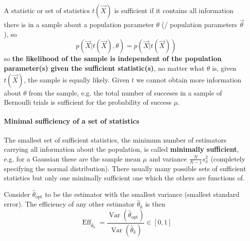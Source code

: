 A statistic or set of statistics $t(\vec{X})$ is sufficient if it contains all information there is in a sample
about a population parameter $\theta$ (/ population parameters $\vec{\theta}$), so
\begin{equation}
   p(\vec{X} | t(\vec{X}), \theta) = p(\vec{X} | t(\vec{X}))
\end{equation}
so \textbf{the likelihood of the sample is independent of the population parameter(s) given the sufficient statistic(s)},
no matter what $\theta$ is, given $t(\vec{X})$, the sample is equally likely. Given $t$ we cannot obtain more
information about $\theta$ from the sample, e.g. the total number of succeses in a sample of Bernoulli trials is sufficient
for the probability of success $\mu$.

\paragraph*{Minimal sufficiency of a set of statistics} The smallest set of sufficient statistics, the minimum number of estimators
carrying all information about the population, is called \textbf{minimally sufficient}, e.g. for a Gaussian these
are the sample mean $\mu$ and variance $\frac{N}{N-1} s_x^2$ (completely specifying the normal distribution). There
usually many possible sets of sufficient statistics but only one minimally sufficient one which the others
are functions of.

Consider $\hat{\theta}_\text{opt}$ to be the estimator with the smallest variance (smallest standard error).
The efficiency of any other estimator $\hat{\theta}_k$ is then
\begin{equation}
    \operatorname{Eff}_{\hat{\theta}_k} = \frac{\operatorname{Var}(\hat{\theta}_\text{opt})}{\operatorname{Var}(\hat{\theta}_k)} \in [0,1]
\end{equation}

